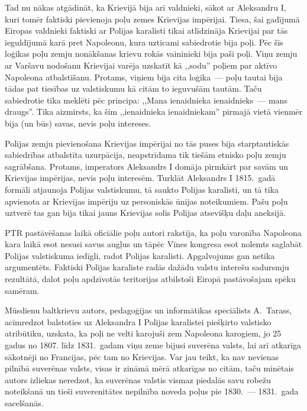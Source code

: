 \documentclass[twoside,a5paper,12pt,fleqn,openany]{extbook}
\begin{document}
Tad nu nākas atgādināt, ka Krievijā bija arī valdnieki, sākot ar Aleksandru I, kuri tomēr faktiski pievienoja poļu zemes Krievijas impērijai. Tiesa, šai gadījumā Eiropas valdnieki faktiski ar Polijas karalisti tikai atlīdzināja Krievijai par tās ieguldījumā karā pret Napoleonu, kura uzticami sabiedrotie bija poļi. Pēc šīs loģikas poļu zemju nonākšanas krievu rokās vaininieki bija paši poļi. Viņu zemju ar Varšavu nodošanu Krievijai varēja uzskatīt kā ,,sodu'' poļiem par aktīvo Napoleona atbalstīšanu. Protams, viņiem bija cita loģika~--- poļu tautai bija tādas pat tiesības uz valstiskumu kā citām to ieguvušām tautām. Taču sabiedrotie tika meklēti pēc principa: ,,Mana ienaidnieka ienaidnieks~--- mans draugs''. Tika aizmirsts, ka šim ,,ienaidnieka ienaidniekam'' pirmajā vietā vienmēr bija (un būs) savas, nevis poļu intereses.

Polijas zemju pievienošana Krievijas impērijai no tās puses bija starptautiskās sabiedrības atbalstīta uzurpācija, neapstrīdama tik tiešām etnisko poļu zemju sagrābšana. Protams, imperators Aleksandrs I domāja pirmkārt par savām un Krievijas impērijas, nevis poļu interesēm. Turklāt Aleksandrs I 1815.~gadā formāli atjaunoja Polijas valstiskumu, tā saukto Polijas karalisti, un tā tika apvienota ar Krievijas impēriju uz personiskās ūnijas noteikumiem. Pašu poļu uztverē tas gan bija tikai jauns Krievijas solis Polijas atsevišķu daļu aneksijā.

PTR pastāvēšanas laikā oficiālie poļu autori rakstīja, ka poļu varonība Napoleona kara laikā esot nesusi savus augļus un tāpēc Vīnes kongresa esot nolemts saglabāt Polijas valstiskuma iedīgli, radot Polijas karalisti. Apgalvojums gan netika argumentēts. Faktiski Polijas karaliste radās dažādu valstu interešu sadursmju rezultātā, dalot poļu apdzīvotās teritorijas atbilstoši Eiropā pastāvošajam spēku samēram.

Mūsdienu baltkrievu autors, pedagoģijas un informātikas speciālists A.~Tarass, acīmredzot balstoties uz Aleksandra I Polijas karalistei piešķirto valstisko atribūtiku, uzskata, ka poļi ne velti karojuši zem Napoleona karogiem, jo 25 gadus no 1807. līdz 1831.~gadam viņu zeme bijusi suverēna valsts, lai arī atkarīga sākotnēji no Francijas, pēc tam no Krievijas. Var jau teikt, ka nav nevienas pilnībā suverēnas valsts, visas ir zināmā mērā atkarīgas no citām, taču minētais autors izliekas neredzot, ka suverēnas valstis vismaz piedalās savu robežu noteikšanā un tieši suverenitātes nepilnība noveda poļus pie 1830.~--- 1831.~gada sacelšanās.
\end{document}
